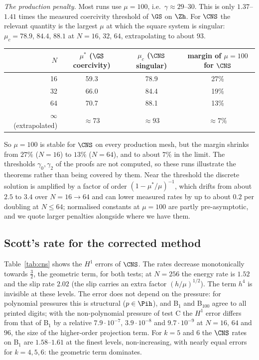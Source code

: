 \emph{The production penalty.} Most runs use $\mu=100$, i.e.\ $\gamma\approx29$--$30$. This is only $1.37$--$1.41$ times the measured coercivity threshold of $\GS$ on $\Zh$. For $\CNS$ the relevant quantity is the largest $\mu$ at which the square system is singular: $\mu_c=78.9$, $84.4$, $88.1$ at $N=16$, $32$, $64$, extrapolating to about $93$. \begin{center}\small
\setlength{\tabcolsep}{3pt}\begin{tabular}{rccc}
\toprule
$N$ & $\mu^\ast$ ($\GS$ coercivity) & $\mu_c$ ($\CNS$ singular) & margin of $\mu=100$ for $\CNS$\\
\midrule
16 & 59.3 & 78.9 & 27\%\\
32 & 66.0 & 84.4 & 19\%\\
64 & 70.7 & 88.1 & 13\%\\
$\infty$ (extrapolated) & $\approx73$ & $\approx93$ & $\approx7\%$\\
\bottomrule
\end{tabular}
\end{center}
So $\mu=100$ is stable for $\CNS$ on every production mesh, but the margin shrinks from $27\%$ ($N=16$) to $13\%$ ($N=64$), and to about $7\%$ in the limit. The thresholds $\gamma_0,\gamma_2$ of the proofs are not computed, so these runs illustrate the theorems rather than being covered by them. Near the threshold the discrete solution is amplified by a factor of order $(1-\mu^\ast/\mu)^{-1}$, which drifts from about $2.5$ to $3.4$ over $N=16\to64$ and can lower measured rates by up to about $0.2$ per doubling at $N\le64$; normalised constants at $\mu=100$ are partly pre-asymptotic, and we quote larger penalties alongside where we have them.

\subsection{Scott's rate for the corrected method}
Table~\ref{tab:cns} shows the $H^1$ errors of $\CNS$. The rates decrease monotonically towards $\frac32$, the geometric term, for both tests; at $N=256$ the energy rate is $1.52$ and the slip rate $2.02$ (the slip carries an extra factor $(h/\mu)^{1/2}$). The term $h^4$ is invisible at these levels. The error does not depend on the pressure: for polynomial pressures this is structural ($p\in\Pih$), and B$_1$ and B$_{100}$ agree to all printed digits; with the non-polynomial pressure of test C the $H^1$ error differs from that of B$_1$ by a relative $7.9\cdot10^{-7}$, $3.9\cdot10^{-8}$ and $9.7\cdot10^{-9}$ at $N=16$, $64$ and $96$, the size of the higher-order projection term. For $k=5$ and $6$ the $\CNS$ rates on B$_1$ are $1.58$--$1.61$ at the finest levels, non-increasing, with nearly equal errors for $k=4,5,6$: the geometric term dominates.

